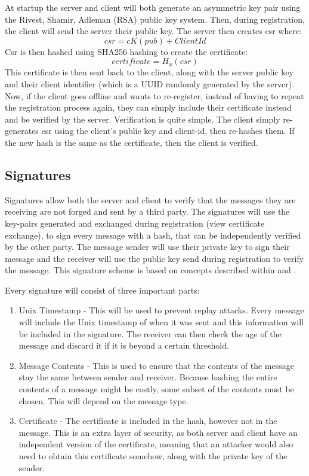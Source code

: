 At startup the server and client will both generate an asymmetric key pair using the Rivest, Shamir, Adleman (RSA) public key system. Then, during registration, the client will send the server their public key. The server then creates csr where: 
\[csr = cK(pub) + ClientId\]
Csr is then hashed using SHA256 hashing to create the certificate: 
\[certificate = H_x(csr)\]
This certificate is then sent back to the client, along with the server public key and their client identifier (which is a UUID randomly generated by the server). Now, if the client goes offline and wants to re-register, instead of having to repeat the registration process again, they can simply include their certificate instead and be verified by the server. Verification is quite simple. The client simply re-generates csr using the client's public key and client-id, then re-hashes them. If the new hash is the same as the certificate, then the client is verified.

\subsection{Signatures}
Signatures allow both the server and client to verify that the messages they are receiving are not forged and sent by a third party. The signatures will use the key-pairs generated and exchanged during registration (view certificate exchange), to sign every message with a hash, that can be independently verified by the other party. The message sender will use their private key to sign their message and the receiver will use the public key send during registration to verify the message. This signature scheme is based on concepts described within \cite{disSysConceptsDesign} and \cite{disSysPrinciples}.

Every signature will consist of three important parts:
\begin{enumerate}
    \item Unix Timestamp - This will be used to prevent replay attacks. Every message will include the Unix timestamp of when it was sent and this information will be included in the signature. The receiver can then check the age of the message and discard it if it is beyond a certain threshold.
    \item Message Contents - This is used to ensure that the contents of the message stay the same between sender and receiver. Because hashing the entire contents of a message might be costly, some subset of the contents must be chosen. This will depend on the message type.
    \item Certificate - The certificate is included in the hash, however not in the message. This is an extra layer of security, as both server and client have an independent version of the certificate, meaning that an attacker would also need to obtain this certificate somehow, along with the private key of the sender.
\end{enumerate}


